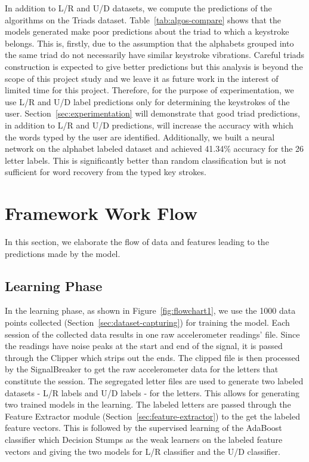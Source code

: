 \documentclass[11pt,conference]{IEEEtran}
\begin{document}
In addition to L/R and U/D datasets, we compute the predictions of the algorithms on the Triads dataset. Table~\ref{tab:algos-compare} shows that the models generated make poor predictions about the triad to which a keystroke belongs. This is, firstly, due to the assumption that the alphabets grouped into the same triad do not necessarily have similar keystroke vibrations. Careful triads construction is expected to give better predictions but this analysis is beyond the scope of this project study and we leave it as future work in the interest of limited time for this project. Therefore, for the purpose of experimentation, we use L/R and U/D label predictions only for determining the keystrokes of the user. Section~\ref{sec:experimentation} will demonstrate that good triad predictions, in addition to L/R and U/D predictions, will increase the accuracy with which the words typed by the user are identified. Additionally, we built a neural network on the alphabet labeled dataset and achieved 41.34\% accuracy for the 26 letter labels. This is significantly better than random classification but is not sufficient for word recovery from the typed key strokes.

\section{Framework Work Flow}
\label{sec:framework}
In this section, we elaborate the flow of data and features leading to the
predictions made by the model.
\subsection{Learning Phase}
\label{sec:learning}
In the learning phase, as shown in Figure~\ref{fig:flowchart1}, we use the 1000 data points collected (Section~\ref{sec:dataset-capturing})
for training the model. Each session of the collected data results in one raw accelerometer readings' file.
Since the readings have noise peaks at the start and end of the signal, it is passed through the Clipper
which strips out the ends. The clipped file is then processed by the SignalBreaker to
get the raw accelerometer data for the letters that constitute the session. The segregated letter files are used
to generate two labeled datasets - L/R labels and U/D labels - for the letters. This allows for generating two
trained models in the learning. The labeled letters are passed through the Feature Extractor module
(Section~\ref{sec:feature-extractor}) to the get the labeled
feature vectors. This is followed by the supervised learning of the AdaBoost classifier which Decision Stumps
as the weak learners on the labeled feature vectors and giving the two models for L/R classifier and
the U/D classifier.
\end{document}
